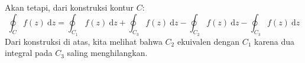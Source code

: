 Akan tetapi, dari konstruksi kontur $C$:
\begin{equation*}
\oint_{C}f(z)\ \mathrm{d}z = \oint_{C_{1}}f(z)\ \mathrm{d}z +
\oint_{C_{3}}f(z)\ \mathrm{d}z - \oint_{C_{2}}f(z)\ \mathrm{d}z - 
\oint_{C_{3}}f(z)\ \mathrm{d}z
\end{equation*}
Dari konstruksi di atas, kita melihat bahwa $C_{2}$ ekuivalen dengan
$C_{1}$ karena dua integral pada $C_{3}$ saling menghilangkan.








